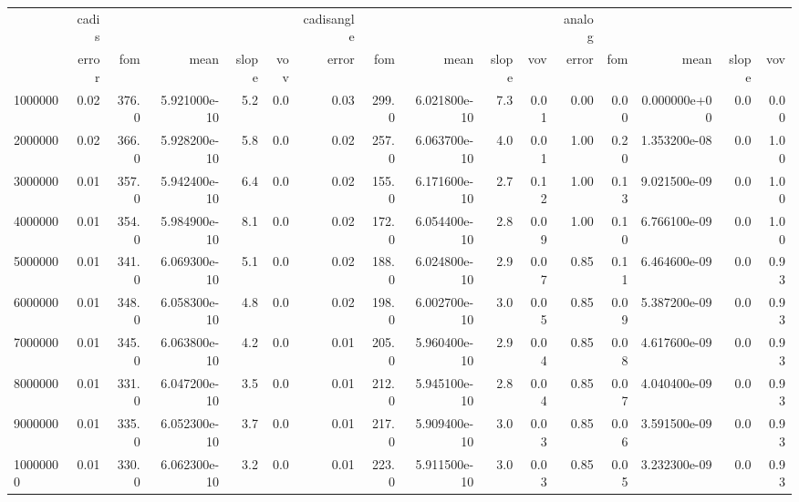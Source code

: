\begin{tabular}{lrrrrrrrrrrrrrrr}
\toprule
{} & cadis &       &               &       &     & cadisangle &       &               &       &      & analog &      &               &       &      \\
{} & error &   fom &          mean & slope & vov &      error &   fom &          mean & slope &  vov &  error &  fom &          mean & slope &  vov \\
\midrule
1000000  &  0.02 & 376.0 &  5.921000e-10 &   5.2 & 0.0 &       0.03 & 299.0 &  6.021800e-10 &   7.3 & 0.01 &   0.00 & 0.00 &  0.000000e+00 &   0.0 & 0.00 \\
2000000  &  0.02 & 366.0 &  5.928200e-10 &   5.8 & 0.0 &       0.02 & 257.0 &  6.063700e-10 &   4.0 & 0.01 &   1.00 & 0.20 &  1.353200e-08 &   0.0 & 1.00 \\
3000000  &  0.01 & 357.0 &  5.942400e-10 &   6.4 & 0.0 &       0.02 & 155.0 &  6.171600e-10 &   2.7 & 0.12 &   1.00 & 0.13 &  9.021500e-09 &   0.0 & 1.00 \\
4000000  &  0.01 & 354.0 &  5.984900e-10 &   8.1 & 0.0 &       0.02 & 172.0 &  6.054400e-10 &   2.8 & 0.09 &   1.00 & 0.10 &  6.766100e-09 &   0.0 & 1.00 \\
5000000  &  0.01 & 341.0 &  6.069300e-10 &   5.1 & 0.0 &       0.02 & 188.0 &  6.024800e-10 &   2.9 & 0.07 &   0.85 & 0.11 &  6.464600e-09 &   0.0 & 0.93 \\
6000000  &  0.01 & 348.0 &  6.058300e-10 &   4.8 & 0.0 &       0.02 & 198.0 &  6.002700e-10 &   3.0 & 0.05 &   0.85 & 0.09 &  5.387200e-09 &   0.0 & 0.93 \\
7000000  &  0.01 & 345.0 &  6.063800e-10 &   4.2 & 0.0 &       0.01 & 205.0 &  5.960400e-10 &   2.9 & 0.04 &   0.85 & 0.08 &  4.617600e-09 &   0.0 & 0.93 \\
8000000  &  0.01 & 331.0 &  6.047200e-10 &   3.5 & 0.0 &       0.01 & 212.0 &  5.945100e-10 &   2.8 & 0.04 &   0.85 & 0.07 &  4.040400e-09 &   0.0 & 0.93 \\
9000000  &  0.01 & 335.0 &  6.052300e-10 &   3.7 & 0.0 &       0.01 & 217.0 &  5.909400e-10 &   3.0 & 0.03 &   0.85 & 0.06 &  3.591500e-09 &   0.0 & 0.93 \\
10000000 &  0.01 & 330.0 &  6.062300e-10 &   3.2 & 0.0 &       0.01 & 223.0 &  5.911500e-10 &   3.0 & 0.03 &   0.85 & 0.05 &  3.232300e-09 &   0.0 & 0.93 \\
\bottomrule
\end{tabular}
